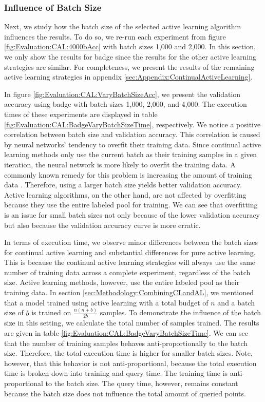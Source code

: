 \subsubsection{Influence of Batch Size}
\label{sec:Evaluation::CAL:ALRegCL:BatchSize}
Next, we study how the batch size of the selected active learning algorithm influences the results. To do so, we re-run each experiment from figure \ref{fig:Evaluation:CAL:4000bAcc}
with batch sizes 1,000 and 2,000. In this section, we only show the results for \gls{badge} since the results for the other active learning strategies are similar. For completeness, we
present the results of the remaining active learning strategies in appendix \ref{sec:Appendix:ContinualActiveLearning}. \par
In figure \ref{fig:Evaluation:CAL:VaryBatchSizeAcc}, we present the validation accuracy using \gls{badge} with batch sizes 1,000, 2,000, and 4,000. The execution times of these experiments
are displayed in table \ref{fig:Evaluation:CAL:BadgeVaryBatchSizeTime}, respectively. We notice a positive correlation between batch size and
validation accuracy. This correlation is caused by neural networks' tendency to overfit their training data. Since continual active learning methods only use the current batch as their training
samples in a given iteration, the neural network is more likely to overfit the training data. A commonly known remedy for this problem is increasing the amount of training data
\cite{ying2019overview}. Therefore, using a larger batch size yields better validation accuracy. Active learning algorithms, on the other hand, are not affected by overfitting because
they use the entire labeled pool for training. We can see that overfitting is an issue for small batch sizes not only because of the lower validation accuracy but also because the validation
accuracy curve is more erratic. \par
In terms of execution time, we observe minor differences between the batch sizes for continual active learning and substantial differences for pure active learning. This is because the continual
active learning strategies will always use the same number of training data across a complete experiment, regardless of the batch size. Active learning methods, however, use the entire labeled pool
as their training data. In section \ref{sec:Methodology:CombiningCLandAL}, we mentioned that a model trained using active learning with a total budget of $n$ and a batch size of $b$ is trained
on $\frac{n(n+b)}{2b}$ samples. To demonstrate the influence of the batch size in this setting, we calculate the total number of samples trained. The results are given in table 
\ref{fig:Evaluation:CAL:BadgeVaryBatchSizeTime}. We can see that the number of training samples behaves anti-proportionally to the batch size. Therefore, the total execution time is higher for smaller batch sizes.
Note, however, that this behavior is not anti-proportional, because the total execution time is broken down into training and query time. The training time is anti-proportional
to the batch size. The query time, however, remains constant because the batch size does not influence the total amount of queried points. \par


